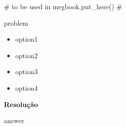 {# to be used in megbook.put_here() #}


%
%

{{ problem }}

\begin{itemize}

\item {{ option1 }}  

\item {{ option2 }}

\item {{ option3 }}

\item {{ option4 }}

\end{itemize}

\noindent\textbf{Resolução}

{{ answer }}



